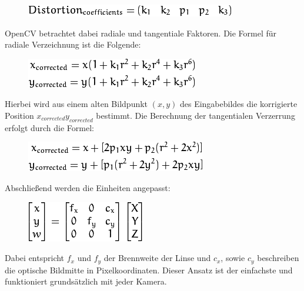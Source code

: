 \begin{figure}[ht]
	\centering
	\includegraphics[scale=0.7]{Bilder/distortion.png}
	\label{fig:distortion}
\end{figure}

OpenCV betrachtet dabei radiale und tangentiale Faktoren. Die Formel für radiale Verzeichnung ist die Folgende:

\begin{figure}[ht]
	\centering
	\includegraphics[scale=0.7]{Bilder/radialFactors.png}
	\label{fig:radial}
\end{figure}

Hierbei wird aus einem alten Bildpunkt $(x,y)$ des Eingabebildes die korrigierte Position $x_{corrected} y_{corrected}$ bestimmt. \newline
Die Berechnung der tangentialen Verzerrung erfolgt durch die Formel:

\begin{figure}[ht]
	\centering
	\includegraphics[scale=0.7]{Bilder/tangentialFactors.png}
	\label{fig:radial}
\end{figure}

Abschließend werden die Einheiten angepasst:

\begin{figure}[ht]
	\centering
	\includegraphics[scale=0.7]{Bilder/matrixEquation.png}
	\label{fig:radial}
\end{figure}

Dabei entspricht $f_x$ und $f_y$ der Brennweite der Linse und $c_x$, sowie $c_y$ beschreiben die optische Bildmitte in Pixelkoordinaten. \newline
Dieser Ansatz ist der einfachste und funktioniert grundsätzlich mit jeder Kamera.

